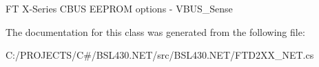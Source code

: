 FT X-\/\+Series C\+B\+US E\+E\+P\+R\+OM options -\/ V\+B\+U\+S\+\_\+\+Sense 



The documentation for this class was generated from the following file\+:\begin{DoxyCompactItemize}
\item 
C\+:/\+P\+R\+O\+J\+E\+C\+T\+S/\+C\#/\+B\+S\+L430.\+N\+E\+T/src/\+B\+S\+L430.\+N\+E\+T/F\+T\+D2\+X\+X\+\_\+\+N\+E\+T.\+cs\end{DoxyCompactItemize}
